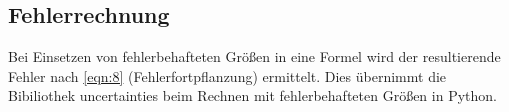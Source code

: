 \subsection{Fehlerrechnung}
Bei Einsetzen von fehlerbehafteten Größen in eine Formel wird der resultierende 
Fehler nach \autoref{eqn:8} (Fehlerfortpflanzung) ermittelt. Dies übernimmt
die Bibiliothek uncertainties beim Rechnen mit fehlerbehafteten Größen in Python.

